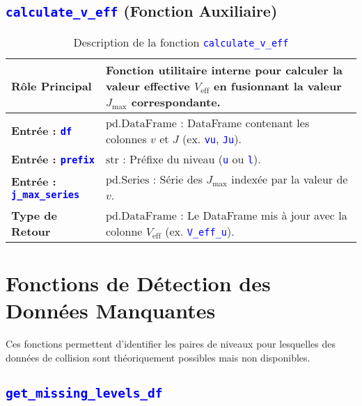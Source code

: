 \documentclass{article}
\newcommand{\code}[1]{\texttt{\textcolor{blue}{#1}}}
\begin{document}
\subsection{\code{calculate\_v\_eff} (Fonction Auxiliaire)}

\begin{longtable}{|>{\raggedright\arraybackslash}p{}|>{\raggedright\arraybackslash}p{}|}
    \caption{Description de la fonction \code{calculate\_v\_eff}} \\
    \toprule
    \textbf{Rôle Principal} & Fonction utilitaire interne pour calculer la valeur effective $V_{\text{eff}}$ en fusionnant la valeur $J_{\text{max}}$ correspondante. \\
    \midrule
    \textbf{Entrée : \code{df}} & $\text{pd.DataFrame}$ : DataFrame contenant les colonnes $v$ et $J$ (ex. \code{vu}, \code{Ju}). \\
    \midrule
    \textbf{Entrée : \code{prefix}} & $\text{str}$ : Préfixe du niveau (\code{u} ou \code{l}). \\
    \midrule
    \textbf{Entrée : \code{j\_max\_series}} & $\text{pd.Series}$ : Série des $J_{\text{max}}$ indexée par la valeur de $v$. \\
    \midrule
    \textbf{Type de Retour} & $\text{pd.DataFrame}$ : Le DataFrame mis à jour avec la colonne $V_{\text{eff}}$ (ex. \code{V\_eff\_u}). \\
    \bottomrule
\end{longtable}

\section{Fonctions de Détection des Données Manquantes}

Ces fonctions permettent d'identifier les paires de niveaux pour lesquelles des données de collision sont théoriquement possibles mais non disponibles.

\subsection{\code{get\_missing\_levels\_df}}
\end{document}
